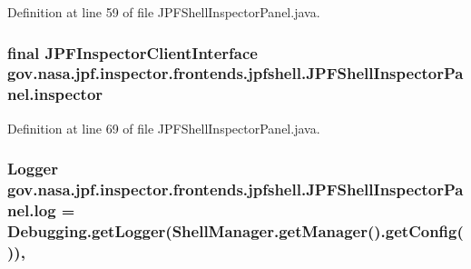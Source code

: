Definition at line 59 of file J\+P\+F\+Shell\+Inspector\+Panel.\+java.

\subsubsection[{\texorpdfstring{inspector}{inspector}}]{\setlength{\rightskip}{0pt plus 5cm}final {\bf J\+P\+F\+Inspector\+Client\+Interface} gov.\+nasa.\+jpf.\+inspector.\+frontends.\+jpfshell.\+J\+P\+F\+Shell\+Inspector\+Panel.\+inspector\hspace{0.3cm}{\ttfamily [private]}}\hypertarget{classgov_1_1nasa_1_1jpf_1_1inspector_1_1frontends_1_1jpfshell_1_1_j_p_f_shell_inspector_panel_acecd6528a364612136bc7cf50bd89e69}{}\label{classgov_1_1nasa_1_1jpf_1_1inspector_1_1frontends_1_1jpfshell_1_1_j_p_f_shell_inspector_panel_acecd6528a364612136bc7cf50bd89e69}


Definition at line 69 of file J\+P\+F\+Shell\+Inspector\+Panel.\+java.

\subsubsection[{\texorpdfstring{log}{log}}]{\setlength{\rightskip}{0pt plus 5cm}Logger gov.\+nasa.\+jpf.\+inspector.\+frontends.\+jpfshell.\+J\+P\+F\+Shell\+Inspector\+Panel.\+log = {\bf Debugging.\+get\+Logger}(Shell\+Manager.\+get\+Manager().get\+Config())\hspace{0.3cm}{\ttfamily [static]}, {\ttfamily [private]}}\hypertarget{classgov_1_1nasa_1_1jpf_1_1inspector_1_1frontends_1_1jpfshell_1_1_j_p_f_shell_inspector_panel_abb8e338d436091e0021a8731aeb75e67}{}\label{classgov_1_1nasa_1_1jpf_1_1inspector_1_1frontends_1_1jpfshell_1_1_j_p_f_shell_inspector_panel_abb8e338d436091e0021a8731aeb75e67}


